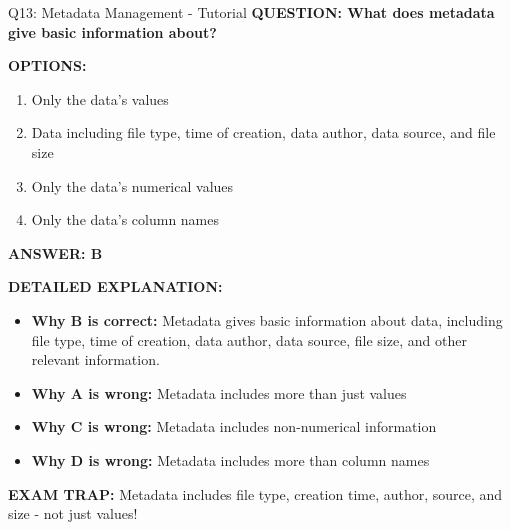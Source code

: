 \documentclass[8pt]{beamer}
\begin{document}
	\begin{frame}{Q13: Metadata Management - Tutorial}
		\fontsize{6.5}{7.5}\selectfont
		\textbf{QUESTION: What does metadata give basic information about?}
		
		\vspace{0.1cm}
		\textbf{OPTIONS:}
		\begin{enumerate}
			\item Only the data's values
			\item Data including file type, time of creation, data author, data source, and file size
			\item Only the data's numerical values
			\item Only the data's column names
		\end{enumerate}
		
		\vspace{0.1cm}
		\textcolor{myblue}{\textbf{ANSWER: B}}
		
		\vspace{0.1cm}
		\textbf{DETAILED EXPLANATION:}
		\begin{itemize}
			\item \textbf{Why B is correct:} Metadata gives basic information about data, including file type, time of creation, data author, data source, file size, and other relevant information.
			\item \textbf{Why A is wrong:} Metadata includes more than just values
			\item \textbf{Why C is wrong:} Metadata includes non-numerical information
			\item \textbf{Why D is wrong:} Metadata includes more than column names
		\end{itemize}
		
		\textcolor{myred}{\textbf{EXAM TRAP:}} Metadata includes \textcolor{myblue}{file type, creation time, author, source, and size} - not just values!
	\end{frame}
	
\end{document}
